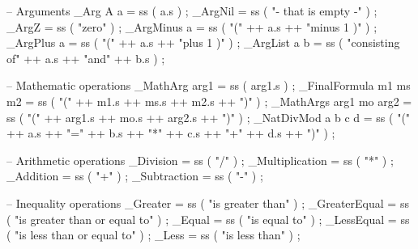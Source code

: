 \begin{lstgf}
{        -- Arguments
        _Arg A a                        = ss ( a.s ) ;
        _ArgNil                         = ss ( "- that is empty -" ) ;
        _ArgZ                           = ss ( "zero" ) ;
        _ArgMinus a                     = ss ( "(" ++ a.s ++ "minus 1 )" ) ;
        _ArgPlus a                      = ss ( "(" ++ a.s ++ "plus 1 )" ) ;
        _ArgList a b                    = ss ( "consisting of" ++ a.s ++ "and" ++ b.s ) ;

        -- Mathematic operations
        _MathArg arg1                   = ss ( arg1.s ) ;
        _FinalFormula m1 ms m2          = ss ( "(" ++ m1.s ++ ms.s ++ m2.s ++ ")" ) ;
        _MathArgs arg1 mo arg2          = ss ( "(" ++ arg1.s ++ mo.s ++ arg2.s ++ ")" ) ;
        _NatDivMod a b c d              = ss ( "(" ++ a.s ++ "=" ++ b.s ++ "*" ++ c.s ++ "+" ++ d.s ++ ")" ) ;

        -- Arithmetic operations
        _Division                       = ss ( "/" ) ;
        _Multiplication                 = ss ( "*" ) ;
        _Addition                       = ss ( "+" ) ;
        _Subtraction                    = ss ( "-" ) ;

        -- Inequality operations
        _Greater                        = ss ( "is greater than" ) ;
        _GreaterEqual                   = ss ( "is greater than or equal to" ) ;
        _Equal                          = ss ( "is equal to" ) ;
        _LessEqual                      = ss ( "is less than or equal to" ) ;
        _Less                           = ss ( "is less than" ) ;

}
\end{lstgf}
